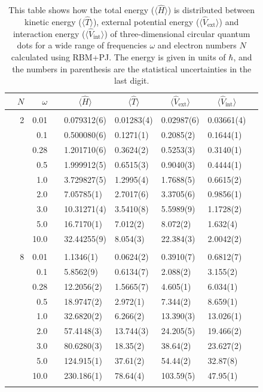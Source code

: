 \begin{table}[H]
	\caption{This table shows how the total energy ($\langle\hat{H}\rangle$) is distributed between kinetic energy ($\langle\hat{T}\rangle$), external potential energy ($\langle\hat{V}_{\text{ext}}\rangle$) and interaction energy ($\langle\hat{V}_{\text{int}}\rangle$) of three-dimensional circular quantum dots for a wide range of frequencies $\omega$ and electron numbers $N$ calculated using RBM+PJ. The energy is given in units of $\hbar$, and the numbers in parenthesis are the statistical uncertainties in the last digit.}
	\label{tab:splitfrequencyQDRBMPJ3D}
	\begin{tabularx}{\textwidth}{R{1cm}rrcR{2.3cm}R{2.3cm}R{2.3cm}R{2.3cm}R{1cm}} \hline\hline
		\makecell{\\ \phantom{$N$}} & $N$ & $\omega$ &&  &  &  &  & \\ \hline \\
		&2 & 0.01 && 0.079312(6) & 0.01283(4) & 0.02987(6) & 0.03661(4) \\
		&& 0.1 && 0.500080(6) & 0.1271(1) & 0.2085(2) & 0.1644(1) \\
		&& 0.28 && 1.201710(6) & 0.3624(2) & 0.5253(3) & 0.3140(1) \\
		&& 0.5 && 1.999912(5) & 0.6515(3) & 0.9040(3) & 0.4444(1) \\
		&& 1.0 && 3.729827(5) & 1.2995(4) & 1.7688(5) & 0.6615(2) \\
		&& 2.0 && 7.05785(1) & 2.7017(6) & 3.3705(6) & 0.9856(1) \\
		&& 3.0 && 10.31271(4) & 3.5410(8) & 5.5989(9) & 1.1728(2) \\ 
		&& 5.0 && 16.7170(1) & 7.012(2) & 8.072(2) & 1.632(4) \\
		&& 10.0 && 32.44255(9) & 8.054(3) & 22.384(3) & 2.0042(2) \\
		\hdashline \\
		
		&8 & 0.01 && 1.1346(1) & 0.0624(2) & 0.3910(7) & 0.6812(7) \\
		&& 0.1 && 5.8562(9) & 0.6134(7) & 2.088(2) & 3.155(2) \\
		&& 0.28 && 12.2056(2) & 1.5665(7) & 4.605(1) & 6.034(1) \\
		&& 0.5 && 18.9747(2) & 2.972(1) & 7.344(2) & 8.659(1) \\
		&& 1.0 && 32.6820(2) & 6.266(2) & 13.390(3) & 13.026(1) \\
		&& 2.0 && 57.4148(3) & 13.744(3) & 24.205(5) & 19.466(2) \\
		&& 3.0 && 80.6280(3) & 18.35(2) & 38.64(2) & 23.627(2) \\ 
		&& 5.0 && 124.915(1) & 37.61(2) & 54.44(2) & 32.87(8) \\
		&& 10.0 && 230.186(1) & 78.64(4) & 103.59(5) & 47.95(1) \\
		\hdashline \\
		

\end{tabularx}
\end{table}
